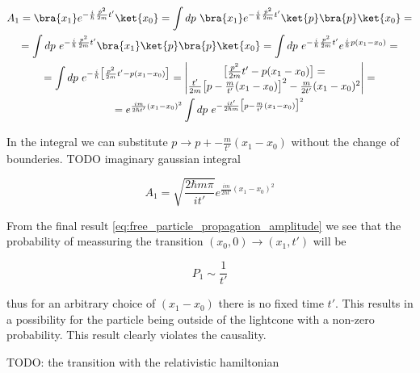 \begin{equation*}
    \begin{gathered}
        A_{1} = \bra{x_{1}} e^{- \frac{i}{\hbar} \frac{\hat{p}^{2}}{2m} t'}\ket{x_{0}} = \int dp \ \bra{x_{1}} e^{- \frac{i}{\hbar} \frac{\hat{p}^{2}}{2m} t'}\ket{p} \bra{p} \ket{x_{0}} = \\
        = \int dp \ e^{- \frac{i}{\hbar} \frac{p^{2}}{2m} t'} \bra{x_{1}}\ket{p} \bra{p} \ket{x_{0}} = \int dp \ e^{- \frac{i}{\hbar} \frac{p^{2}}{2m} t'} e^{\frac{i}{\hbar}p (x_{1} - x_{0})} = \\
        = \int dp \ e^{- \frac{i}{\hbar} \big[\frac{p^{2}}{2m} t' - p (x_{1} - x_{0})\big]} = 
        \begin{vmatrix}
            \big[\frac{p^{2}}{2m} t' - p (x_{1} - x_{0})\big] =  \\
            \frac{t'}{2m} \big[p - \frac{m}{t'}(x_{1} - x_{0})\big]^{2} - \frac{m}{2t'}(x_{1} - x_{0})^{2} \\
        \end{vmatrix} = \\
        = e^{\frac{im}{2\hbar t'} (x_{1} - x_{0})^{2}} \int dp \ e^{- \frac{i t'}{2 \hbar m} \big[p - \frac{m}{t'}(x_{1} - x_{0})\big]^{2}} \\
    \end{gathered}
\end{equation*}

In the integral we can substitute $p \to p + - \frac{m}{t'}(x_{1} - x_{0})$ without the change of bounderies. TODO imaginary gaussian integral

\begin{equation}
    \label{eq:free_particle_propagation_amplitude}
    A_{1} = \sqrt{\frac{2 \hbar m \pi}{i t'}} e^{\frac{im}{2\hbar t'} (x_{1} - x_{0})^{2}}
\end{equation}

From the final result \ref{eq:free_particle_propagation_amplitude}  we see that the probability of meassuring the
transition $(x_{0}, 0) \to (x_{1}, t')$ will be

\begin{equation*}
    P_{1} \sim \frac{1}{t'}
\end{equation*}

thus for an arbitrary choice of $(x_{1} - x_{0})$ there is no fixed time $t'$. This results in a possibility for the particle
being outside of the lightcone with a non-zero probability. This result clearly violates the causality. 

TODO: the transition with the relativistic hamiltonian
